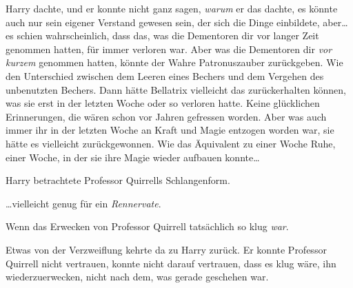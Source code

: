 Harry dachte, und er konnte nicht ganz sagen, \emph{warum} er das dachte, es könnte auch nur sein eigener Verstand gewesen sein, der sich die Dinge einbildete, aber… es schien wahrscheinlich, dass das, was die Dementoren dir vor langer Zeit genommen hatten, für immer verloren war. Aber was die Dementoren dir \emph{vor kurzem} genommen hatten, könnte der Wahre Patronuszauber zurückgeben. Wie den Unterschied zwischen dem Leeren eines Bechers und dem Vergehen des unbenutzten Bechers. Dann hätte Bellatrix vielleicht das zurückerhalten können, was sie erst in der letzten Woche oder so verloren hatte. Keine glücklichen Erinnerungen, die wären schon vor Jahren gefressen worden. Aber was auch immer ihr in der letzten Woche an Kraft und Magie entzogen worden war, sie hätte es vielleicht zurückgewonnen. Wie das Äquivalent zu einer Woche Ruhe, einer Woche, in der sie ihre Magie wieder aufbauen konnte…

Harry betrachtete Professor Quirrells Schlangenform.

…vielleicht genug für ein \emph{Rennervate}.%

Wenn das Erwecken von Professor Quirrell tatsächlich so klug \emph{war}.

Etwas von der Verzweiflung kehrte da zu Harry zurück. Er konnte Professor Quirrell nicht vertrauen, konnte nicht darauf vertrauen, dass es klug wäre, ihn wiederzuerwecken, nicht nach dem, was gerade geschehen war.

